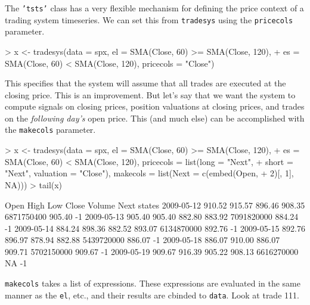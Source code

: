 \documentclass[a4]{article}
\newcommand{\code}[1]{\texttt{#1}}
\begin{document}
The \code{'tsts'} class has a very flexible mechanism for defining the
price context of a trading system timeseries. We can set this from
\code{tradesys} using the \code{pricecols} parameter.
\begin{Schunk}
\begin{Sinput}
> x <- tradesys(data = spx, el = SMA(Close, 60) >= SMA(Close, 120), 
+     es = SMA(Close, 60) < SMA(Close, 120), pricecols = "Close")
\end{Sinput}
\end{Schunk}

This specifies that the system will assume that all trades are
executed at the closing price. This is an improvement. But let's say
that we want the system to compute signals on closing prices, position
valuations at closing prices, and trades on the \emph{following day's}
open price. This (and much else) can be accomplished with the
\code{makecols} parameter.
\begin{Schunk}
\begin{Sinput}
> x <- tradesys(data = spx, el = SMA(Close, 60) >= SMA(Close, 120), 
+     es = SMA(Close, 60) < SMA(Close, 120), pricecols = list(long = "Next", 
+         short = "Next", valuation = "Close"), makecols = list(Next = c(embed(Open, 
+         2)[, 1], NA)))
> tail(x)
\end{Sinput}
\begin{Soutput}
             Open   High    Low  Close     Volume   Next states
2009-05-12 910.52 915.57 896.46 908.35 6871750400 905.40     -1
2009-05-13 905.40 905.40 882.80 883.92 7091820000 884.24     -1
2009-05-14 884.24 898.36 882.52 893.07 6134870000 892.76     -1
2009-05-15 892.76 896.97 878.94 882.88 5439720000 886.07     -1
2009-05-18 886.07 910.00 886.07 909.71 5702150000 909.67     -1
2009-05-19 909.67 916.39 905.22 908.13 6616270000     NA     -1
\end{Soutput}
\end{Schunk}
\code{makecols} takes a list of expressions. These expressions are
evaluated in the same manner as the \code{el}, etc., and their results
are cbinded to \code{data}. Look at trade 111.
\end{document}
